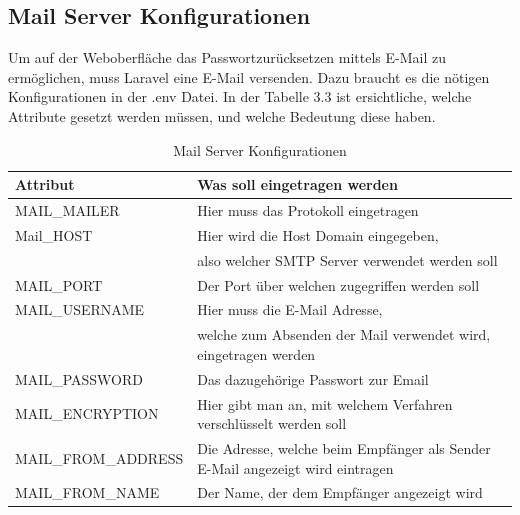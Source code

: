 \subsection{Mail Server Konfigurationen}
Um auf der Weboberfläche das Passwortzurücksetzen mittels E-Mail zu ermöglichen, muss Laravel eine E-Mail versenden. Dazu braucht es die nötigen Konfigurationen in der .env Datei. In der Tabelle 3.3 ist ersichtliche, welche Attribute gesetzt werden müssen, und welche Bedeutung diese haben.
\begin{table}[h]
	
	\begin{tabular}{|l|l|}
		\hline
		Attribut         & Was soll eingetragen werden                        \\ \hline
		MAIL\_MAILER     & Hier muss das Protokoll eingetragen                     \\ \hline
		Mail\_HOST          & Hier wird die Host Domain  eingegeben,\\&also welcher SMTP Server verwendet werden soll         \\ \hline
		MAIL\_PORT       & Der Port über welchen zugegriffen werden soll \\ \hline
		MAIL\_USERNAME      & Hier muss die E-Mail Adresse,\\& welche zum Absenden der Mail verwendet wird, eingetragen werden \\ \hline
		MAIL\_PASSWORD   & Das dazugehörige Passwort zur Email                \\ \hline
		MAIL\_ENCRYPTION    & Hier gibt man an, mit welchem Verfahren verschlüsselt werden soll                             \\ \hline
		MAIL\_FROM\_ADDRESS & Die Adresse, welche beim Empfänger als Sender E-Mail angezeigt wird  eintragen                 \\ \hline
		MAIL\_FROM\_NAME & Der Name, der dem Empfänger angezeigt wird    \\ \hline
	\end{tabular}
\caption{Mail Server Konfigurationen}
\label{sec: Mail Server Konfigurationen}
\end{table}

